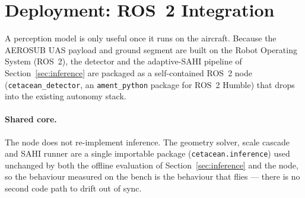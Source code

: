 \documentclass[11pt,a4paper]{article}
\begin{document}
\section{Deployment: ROS~2 Integration}\label{sec:ros}
A perception model is only useful once it runs on the aircraft. Because the
AEROSUB UAS payload and ground segment are built on the Robot Operating System
(ROS~2), the detector and the adaptive-SAHI pipeline of
Section~\ref{sec:inference} are packaged as a self-contained ROS~2 node
(\texttt{cetacean\_detector}, an \texttt{ament\_python} package for ROS~2 Humble)
that drops into the existing autonomy stack.

\paragraph{Shared core.}
The node does not re-implement inference. The geometry solver, scale cascade and
SAHI runner are a single importable package (\texttt{cetacean.inference}) used
unchanged by both the offline evaluation of Section~\ref{sec:inference} and the
node, so the behaviour measured on the bench is the behaviour that flies --- there
is no second code path to drift out of sync.
\end{document}
